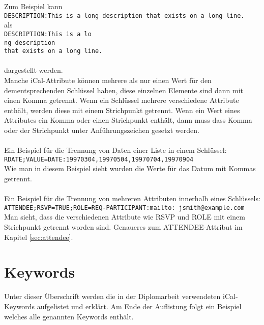 Zum Beispiel kann\vspace*{2mm}\\
\texttt{DESCRIPTION:This is a long description that exists on a long line.}\vspace*{2mm}\\als\vspace*{2mm}\\
\texttt{DESCRIPTION:This is a lo\\ 
 ng description\\  
  that exists on a long line.}\\\\
dargestellt werden.\vspace*{2mm}\\
Manche iCal-Attribute können mehrere als nur einen Wert für den dementsprechenden Schlüssel haben, diese einzelnen Elemente sind dann mit einen Komma getrennt. Wenn ein Schlüssel mehrere verschiedene Attribute enthält, werden diese mit einem Strichpunkt getrennt. Wenn ein Wert eines Attributes ein Komma oder einen Strichpunkt enthält, dann muss dass Komma oder der Strichpunkt unter Anführungszeichen gesetzt werden.\\\\
Ein Beispiel für die Trennung von Daten einer Liste in einem Schlüssel:\vspace*{2mm}\\
\texttt{RDATE;VALUE=DATE:19970304,19970504,19970704,19970904}\vspace*{2mm}\\
Wie man in diesem Beispiel sieht wurden die Werte für das Datum mit Kommas getrennt.\\\\
Ein Beispiel für die Trennung von mehreren Attributen innerhalb eines Schlüssels:\vspace*{2mm}\\
\texttt{ATTENDEE;RSVP=TRUE;ROLE=REQ-PARTICIPANT:mailto:
jsmith@example.com}\vspace*{2mm}\\Man sieht, dass die verschiedenen Attribute wie RSVP und ROLE mit einem Strichpunkt getrennt worden sind. Genaueres zum ATTENDEE-Attribut im Kapitel \ref{sec:attendee}. 
\\\textcite{iCalDocumentation} 

\pagebreak
\renewcommand{\theauthor}{Dario Wagner}
\section{Keywords}
\label{sec:keywords}
Unter dieser Überschrift werden die in der Diplomarbeit verwendeten iCal-Keywords aufgelistet und erklärt. Am Ende der Auflistung folgt ein Beispiel welches alle genannten Keywords enthält. 
